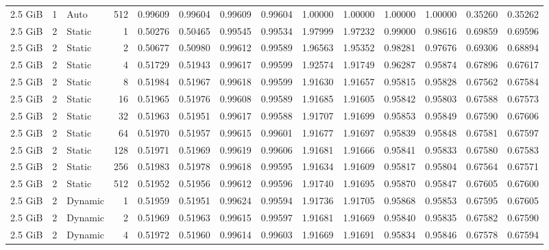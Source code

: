 \begin{table}[H]
\begin{adjustbox}{width=\textwidth, keepaspectratio}
\begin{tabular}{rrlrrrrrrrrrrr}
                    2.5 GiB & 1 & Auto & 512 & 0.99609 & 0.99604 & 0.99609 & 0.99604 & 1.00000 & 1.00000 & 1.00000 & 1.00000 & 0.35260 & 0.35262 \\
                    2.5 GiB & 2 & Static & 1 & 0.50276 & 0.50465 & 0.99545 & 0.99534 & 1.97999 & 1.97232 & 0.99000 & 0.98616 & 0.69859 & 0.69596 \\
                    2.5 GiB & 2 & Static & 2 & 0.50677 & 0.50980 & 0.99612 & 0.99589 & 1.96563 & 1.95352 & 0.98281 & 0.97676 & 0.69306 & 0.68894 \\
                    2.5 GiB & 2 & Static & 4 & 0.51729 & 0.51943 & 0.99617 & 0.99599 & 1.92574 & 1.91749 & 0.96287 & 0.95874 & 0.67896 & 0.67617 \\
                    2.5 GiB & 2 & Static & 8 & 0.51984 & 0.51967 & 0.99618 & 0.99599 & 1.91630 & 1.91657 & 0.95815 & 0.95828 & 0.67562 & 0.67584 \\
                    2.5 GiB & 2 & Static & 16 & 0.51965 & 0.51976 & 0.99608 & 0.99589 & 1.91685 & 1.91605 & 0.95842 & 0.95803 & 0.67588 & 0.67573 \\
                    2.5 GiB & 2 & Static & 32 & 0.51963 & 0.51951 & 0.99617 & 0.99588 & 1.91707 & 1.91699 & 0.95853 & 0.95849 & 0.67590 & 0.67606 \\
                    2.5 GiB & 2 & Static & 64 & 0.51970 & 0.51957 & 0.99615 & 0.99601 & 1.91677 & 1.91697 & 0.95839 & 0.95848 & 0.67581 & 0.67597 \\
                    2.5 GiB & 2 & Static & 128 & 0.51971 & 0.51969 & 0.99619 & 0.99606 & 1.91681 & 1.91666 & 0.95841 & 0.95833 & 0.67580 & 0.67583 \\
                    2.5 GiB & 2 & Static & 256 & 0.51983 & 0.51978 & 0.99618 & 0.99595 & 1.91634 & 1.91609 & 0.95817 & 0.95804 & 0.67564 & 0.67571 \\
                    2.5 GiB & 2 & Static & 512 & 0.51952 & 0.51956 & 0.99612 & 0.99596 & 1.91740 & 1.91695 & 0.95870 & 0.95847 & 0.67605 & 0.67600 \\
                    2.5 GiB & 2 & Dynamic & 1 & 0.51959 & 0.51951 & 0.99624 & 0.99594 & 1.91736 & 1.91705 & 0.95868 & 0.95853 & 0.67595 & 0.67605 \\
                    2.5 GiB & 2 & Dynamic & 2 & 0.51969 & 0.51963 & 0.99615 & 0.99597 & 1.91681 & 1.91669 & 0.95840 & 0.95835 & 0.67582 & 0.67590 \\
                    2.5 GiB & 2 & Dynamic & 4 & 0.51972 & 0.51960 & 0.99614 & 0.99603 & 1.91669 & 1.91691 & 0.95834 & 0.95846 & 0.67578 & 0.67594 \\

\end{tabular}
\end{adjustbox}
\end{table}
